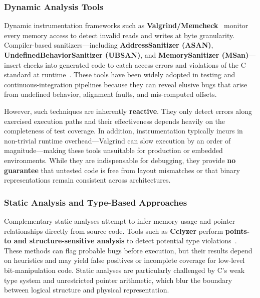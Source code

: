 \subsubsection{Dynamic Analysis Tools}
Dynamic instrumentation frameworks such as
\textbf{Valgrind/Memcheck}~\autocite{valgrind} monitor every
memory access to detect invalid reads and writes at byte granularity.
Compiler-based sanitizers—including \textbf{AddressSanitizer (ASAN)},
\textbf{UndefinedBehaviorSanitizer (UBSAN)}, and
\textbf{MemorySanitizer (MSan)}—insert checks into generated code to catch
access errors and violations of the C standard at runtime~\autocite{ubsan,asan}.
These tools have been widely adopted in testing and continuous-integration
pipelines because they can reveal elusive bugs that arise from
undefined behavior, alignment faults,
and mis-computed offsets.

However, such techniques are inherently \textbf{reactive}. They only
detect errors along exercised execution paths and their effectiveness
depends heavily on the completeness of test coverage.
In addition, instrumentation typically incurs in non-trivial
runtime overhead—Valgrind can slow execution by an order of magnitude—making
these tools unsuitable for production or embedded environments. While
they are indispensable for debugging, they provide \textbf{no guarantee}
that untested code is free from layout mismatches or that binary
representations remain consistent across architectures. 

\subsubsection{Static Analysis and Type-Based Approaches}
Complementary static analyses attempt to infer
memory usage and pointer relationships directly from source code.
Tools such as \textbf{Cclyzer} perform
\textbf{points-to and structure-sensitive analysis} to detect potential
type violations~\autocite{balatsouras2016structure}. 
These methods can flag probable bugs before execution, but their
results depend on heuristics and may yield false positives or incomplete
coverage for low-level bit-manipulation code. Static analyses
are particularly challenged by C's weak type system and unrestricted
pointer arithmetic, which blur the boundary between logical structure
and physical representation.

